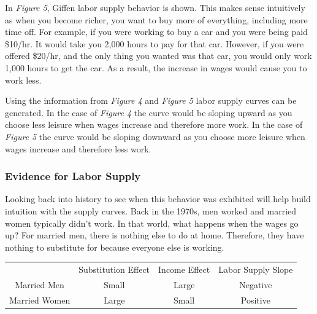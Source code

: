 \documentclass{article}
\begin{document}
In \textit{Figure 5}, Giffen labor supply behavior is shown. This makes sense intuitively as when you become richer, you want to buy more of everything, including more time off. For example, if you were working to buy a car and you were being paid \$10/hr. It would take you 2,000 hours to pay for that car. However, if you were offered \$20/hr, and the only thing you wanted was that car, you would only work 1,000 hours to get the car. As a result, the increase in wages would cause you to work less.

Using the information from \textit{Figure 4} and \textit{Figure 5} labor supply curves can be generated. In the case of \textit{Figure 4} the curve would be sloping upward as you choose less leisure when wages increase and therefore more work. In the case of \textit{Figure 5} the curve would be sloping downward as you choose more leisure when wages increase and therefore less work.

\subsubsection{Evidence for Labor Supply}

Looking back into history to see when this behavior was exhibited will help build intuition with the supply curves. Back in the 1970s, men worked and married women typically didn't work. In that world, what happens when the wages go up? For married men, there is nothing else to do at home. Therefore, they have nothing to substitute for because everyone else is working.

\begin{center}
    \begin{tabular}{c c c c}
        & Substitution Effect & Income Effect & Labor Supply Slope \\
        Married Men & Small & Large & Negative \\
        Married Women & Large & Small & Positive 
    \end{tabular}
\end{center}
\end{document}
